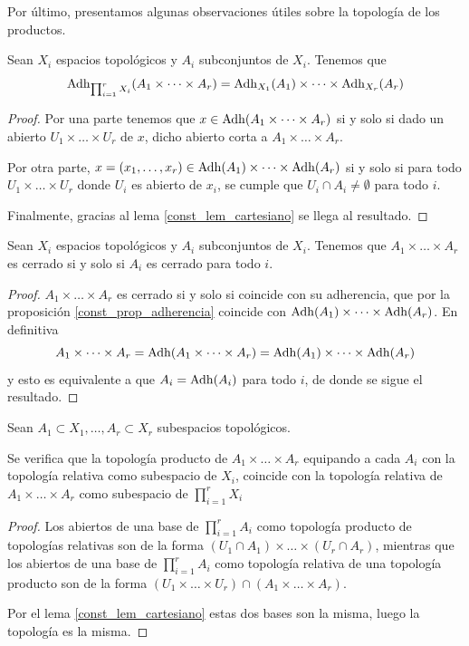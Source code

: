 Por último, presentamos algunas observaciones útiles sobre la topología de los productos.
\begin{prop}[Adherencia]
	\label{const_prop_adherencia}
	Sean $X_i$ espacios topológicos y $A_i$ subconjuntos de $X_i$. Tenemos que
	\[\operatorname{\mathrm{Adh}}_{\prod_{i=1}^r X_i}(A_1 \times \dots \times A_r) = \operatorname{\mathrm{Adh}}_{X_1}(A_1) \times \dots \times \operatorname{\mathrm{Adh}}_{X_r}(A_r)\]
\end{prop}
\begin{proof}
	 Por una parte tenemos que $x \in \operatorname{\mathrm{Adh}}(A_1 \times \dots \times A_r)$ si y solo si dado un abierto $U_1 \times \dots \times U_r$ de $x$, dicho abierto corta a $A_1 \times \dots \times A_r$.
	 
	 Por otra parte, $x=(x_1,\dots,x_r) \in  \operatorname{\mathrm{Adh}}(A_1) \times \dots \times \operatorname{\mathrm{Adh}}(A_r)$ si y solo si para todo $U_1 \times \dots \times U_r$ donde $U_i$ es abierto de $x_i$, se cumple que $U_i \cap A_i \neq \emptyset$ para todo $i$.
	 
	 Finalmente, gracias al lema \ref{const_lem_cartesiano} se llega al resultado.
\end{proof}

\begin{cor}[Cerrados]
	Sean $X_i$ espacios topológicos y $A_i$ subconjuntos de $X_i$. Tenemos que
	$A_1 \times \dots \times A_r$ es cerrado si y solo si $A_i$ es cerrado para todo $i$.
\end{cor}
\begin{proof}
	$A_1 \times \dots \times A_r$ es cerrado si y solo si coincide con su adherencia, que por la proposición \ref{const_prop_adherencia} coincide con $\operatorname{\mathrm{Adh}}(A_1) \times \dots \times \operatorname{\mathrm{Adh}}(A_r)$. En definitiva
	\[A_1 \times \dots \times A_r=\operatorname{\mathrm{Adh}}(A_1 \times \dots \times A_r)=\operatorname{\mathrm{Adh}}(A_1) \times \dots \times \operatorname{\mathrm{Adh}}(A_r)\]
	y esto es equivalente a que $A_i=\operatorname{\mathrm{Adh}}(A_i)$ para todo $i$, de donde se sigue el resultado.
\end{proof}	
\begin{prop}[Subespacios]
	Sean $A_1\subset X_1,\dots,A_r\subset X_r$ subespacios topológicos.
	
	Se verifica que la topología producto de $A_1\times\dots\times A_r$ equipando a cada $A_i$ con la topología relativa como subespacio de $X_i$, coincide con la topología relativa de $A_1\times\dots\times A_r$ como subespacio de $\prod_{i=1}^rX_i$
\end{prop}	
\begin{proof}
	Los abiertos de una base de $\prod_{i=1}^rA_i$ como topología producto de topologías relativas son de la forma $(U_1\cap A_1)\times\dots\times(U_r\cap A_r)$, mientras que los abiertos de una base de $\prod_{i=1}^rA_i$ como topología relativa de una topología producto son de la forma $(U_1\times\dots\times U_r)\cap (A_1\times \dots \times A_r)$.
	
	Por el lema \ref{const_lem_cartesiano} estas dos bases son la misma, luego la topología es la misma.
\end{proof}
